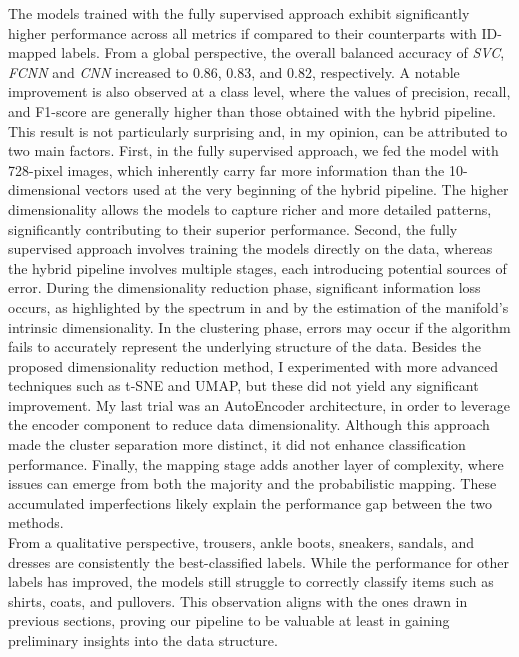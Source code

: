 The models trained with the fully supervised approach exhibit significantly higher performance across all metrics if compared 
to their counterparts with ID-mapped labels. From a global perspective, the overall balanced accuracy of \emph{SVC}, \emph{FCNN} and \emph{CNN} 
increased to 0.86, 0.83, and 0.82, respectively. A notable improvement is also observed at a class level, where the values 
of precision, recall, and F1-score are generally higher than those obtained with the hybrid pipeline. This result is not 
particularly surprising and, in my opinion, can be attributed to two main factors. First, in the fully supervised approach, 
we fed the model with 728-pixel images, which inherently carry far more information than the 10-dimensional vectors used at the very 
beginning of the hybrid pipeline. The higher dimensionality allows the models to capture richer and more detailed patterns, significantly 
contributing to their superior performance. Second, the fully supervised approach involves training the models directly 
on the data, whereas the hybrid pipeline involves multiple stages, each introducing potential sources of error. During the 
dimensionality reduction phase, significant information loss occurs, as highlighted by the spectrum in 
and by the estimation of the manifold's intrinsic dimensionality. 
In the clustering phase, errors may occur if the algorithm fails to accurately represent the underlying structure of the data.
Besides the proposed dimensionality reduction method, I experimented with more advanced techniques such as t-SNE and UMAP, but 
these did not yield any significant improvement. My last trial was an AutoEncoder architecture, in order to leverage the 
encoder component to reduce data dimensionality. Although this approach made the cluster separation more distinct, 
it did not enhance classification performance. Finally, the mapping stage adds another layer of complexity, where issues can emerge from 
both the majority and the probabilistic mapping. These accumulated imperfections likely explain the performance gap between the 
two methods.\\[0.2cm]
From a qualitative perspective, trousers, ankle boots, sneakers, sandals, and dresses are consistently the best-classified labels. 
While the performance for other labels has improved, the models still struggle to correctly classify items such as shirts, coats, 
and pullovers. This observation aligns with the ones drawn in previous sections, proving our
pipeline to be valuable at least in gaining preliminary insights into the data structure.\\[0.2cm]

